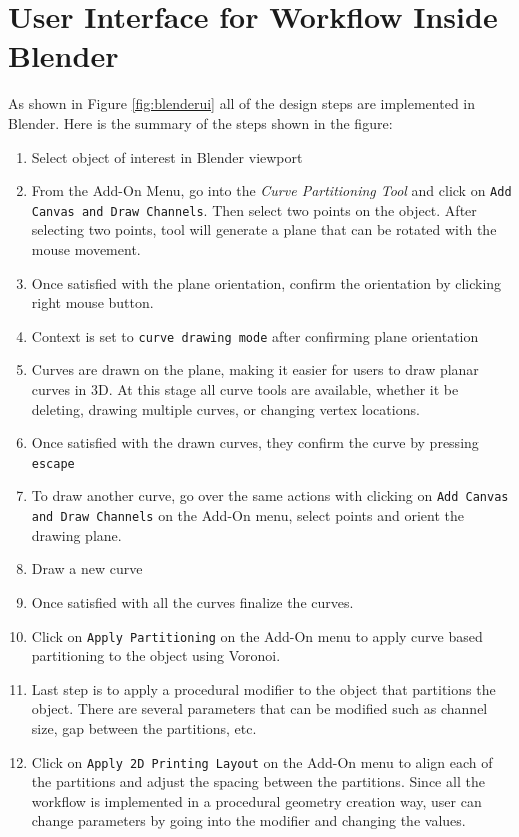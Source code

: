   \section{User Interface for Workflow Inside Blender\label{app:blender}}
As shown in Figure \ref{fig:blenderui} all of the design steps are implemented in Blender. Here is the summary of the steps shown in the figure:

\begin{enumerate}[noitemsep, leftmargin=*]
    \item Select object of interest in Blender viewport
    \item From the Add-On Menu, go into the \textit{Curve Partitioning Tool} and click on \verb|Add Canvas and Draw Channels|. Then select two points on the object. After selecting two points, tool will generate a plane that can be rotated with the mouse movement.
    \item Once satisfied with the plane orientation, confirm the orientation by clicking right mouse button. 
    \item Context is set to \verb|curve drawing mode| after confirming plane orientation
    \item Curves are drawn on the plane, making it easier for users to draw planar curves in 3D. At this stage all curve tools are available, whether it be deleting, drawing multiple curves, or changing vertex locations. %
    \item Once satisfied with the drawn curves, they confirm the curve by pressing \verb|escape|
    \item To draw another curve, go over the same actions with clicking on \verb|Add Canvas and Draw Channels| on the Add-On menu, select points and orient the drawing plane.
    \item Draw a new curve
    \item Once satisfied with all the curves finalize the curves.
    \item Click on \verb|Apply Partitioning| on the Add-On menu to apply curve based partitioning to the object using Voronoi.
    \item Last step is to apply a procedural modifier to the object that partitions the object. There are several parameters that can be modified such as channel size, gap between the partitions, etc.
    \item Click on \verb|Apply 2D Printing Layout| on the Add-On menu to align each of the partitions and adjust the spacing between the partitions. Since all the workflow is implemented in a procedural geometry creation way, user can change parameters by going into the modifier and changing the values.
\end{enumerate}